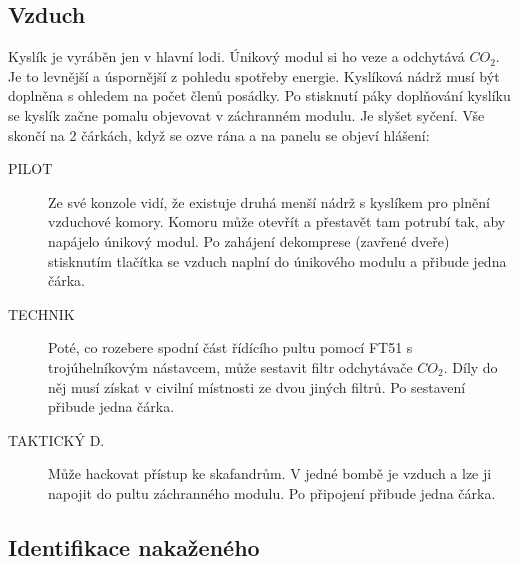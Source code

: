\documentclass[11pt,oneside,a4paper]{article}
\begin{document}
\subsection{\texorpdfstring{Vzduch}{Vzduch}}
\label{subsec:vzduch}
Kyslík je vyráběn jen v hlavní lodi. Únikový modul si ho veze a odchytává $CO_2$. Je to levnější a úspornější z pohledu spotřeby energie. Kyslíková nádrž musí být doplněna s ohledem na počet členů posádky. Po stisknutí páky doplňování kyslíku se kyslík začne pomalu objevovat v záchranném modulu. Je slyšet syčení. Vše skončí na 2 čárkách, když se ozve rána a na panelu se objeví hlášení:

\begin{quote}
\end{quote}

\begin{description}
\item[PILOT] Ze své konzole vidí, že existuje druhá menší nádrž s kyslíkem pro plnění vzduchové komory. Komoru může otevřít a přestavět tam potrubí tak, aby napájelo únikový modul. Po zahájení dekomprese (zavřené dveře) stisknutím tlačítka se vzduch naplní do únikového modulu a přibude jedna čárka.
\item[TECHNIK] Poté, co rozebere spodní část řídícího pultu pomocí FT51 s trojúhelníkovým nástavcem, může sestavit filtr odchytávače $CO_2$. Díly do něj musí získat v civilní místnosti ze dvou jiných filtrů. Po sestavení přibude jedna čárka.
\item[TAKTICKÝ D.] Může hackovat přístup ke skafandrům. V jedné bombě je vzduch a lze ji napojit do pultu záchranného modulu. Po připojení přibude jedna čárka.

\end{description}

\subsection{\texorpdfstring{Identifikace nakaženého}{Identifikace nakazeneho}}
\label{subsec:identifikace_nakazeneho}
\end{document}
